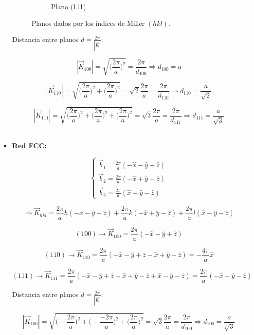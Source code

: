 \documentclass[a4paper]{article}
\begin{document}
\begin{itemize}
\begin{figure}[H]
\begin{subfigure}[b]{0.4\linewidth}
    \caption{Plano (111)}
  \end{subfigure}
  \caption{Planos dados por los \'indices de Miller $(hkl)$.}
  \label{fig:miller_planos}
\end{figure}

Distancia entre planos $d = \frac{2\pi}{|\vec{K}|}$:

$$| \vec{K}_{100} | = \sqrt{\bigg(\frac{2 \pi}{a}\bigg)^{2}} =  \frac{2\pi}{d_{100}} \Rightarrow d_{100} = a$$

$$| \vec{K}_{110} | = \sqrt{\bigg(\frac{2 \pi}{a}\bigg)^{2} + \bigg(\frac{2 \pi}{a}\bigg)^{2}} = \sqrt{2} \frac{2\pi}{a} =  \frac{2\pi}{d_{110}} \Rightarrow d_{110} = \frac{a}{\sqrt{2}}$$

$$| \vec{K}_{111} | = \sqrt{\bigg(\frac{2 \pi}{a}\bigg)^{2} + \bigg(\frac{2 \pi}{a}\bigg)^{2} + \bigg(\frac{2 \pi}{a}\bigg)^{2}} = \sqrt{3} \frac{2\pi}{a} =  \frac{2\pi}{d_{111}} \Rightarrow d_{111} = \frac{a}{\sqrt{3}}$$
\\

\item \textbf{Red FCC:}

$$\begin{cases}
\vec{b}_{1} = \frac{2 \pi}{a}(-\hat{x} - \hat{y} + \hat{z})\\
\vec{b}_{2} = \frac{2 \pi}{a}(-\hat{x} + \hat{y} - \hat{z}) \\
\vec{b}_{3} = \frac{2 \pi}{a}(\hat{x} - \hat{y} - \hat{z})
\end{cases}$$

$$\Rightarrow \vec{K}_{hkl} = \frac{2 \pi}{a}h(-\hat{x} - \hat{y} + \hat{z}) + \frac{2 \pi}{a}k(-\hat{x} + \hat{y} - \hat{z}) + \frac{2 \pi}{a}l(\hat{x} - \hat{y} - \hat{z})$$



$$(100) \rightarrow \vec{K}_{100} = \frac{2 \pi}{a}(-\hat{x} - \hat{y} + \hat{z})$$

$$(110) \rightarrow \vec{K}_{110} = \frac{2 \pi}{a}(-\hat{x} - \hat{y} + \hat{z} -\hat{x} + \hat{y} - \hat{z}) = -\frac{4 \pi}{a}\hat{x}$$

$$(111) \rightarrow \vec{K}_{111} = \frac{2 \pi}{a}(-\hat{x} - \hat{y} + \hat{z} -\hat{x} + \hat{y} - \hat{z} + \hat{x} - \hat{y} - \hat{z}) = \frac{2 \pi}{a}(-\hat{x} - \hat{y} - \hat{z})$$


Distancia entre planos $d = \frac{2\pi}{|\vec{K}|}$:

$$| \vec{K}_{100} | = \sqrt{\bigg(-\frac{2 \pi}{a}\bigg)^{2} + \bigg(-\frac{-2 \pi}{a}\bigg)^{2} + \bigg(\frac{2 \pi}{a}\bigg)^{2}} =  \sqrt{3} \frac{2\pi}{a} =  \frac{2\pi}{d_{100}} \Rightarrow d_{100} = \frac{a}{\sqrt{3}}$$


\end{itemize}
\end{document}
